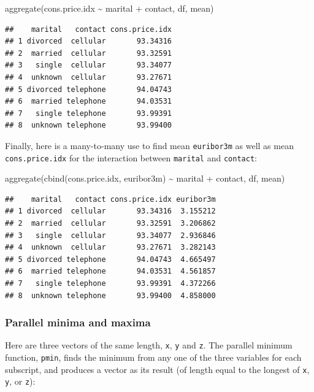 \documentclass[
]{book}
\newenvironment{Shaded}{\begin{snugshade}}{\end{snugshade}}
\newcommand{\FunctionTok}[1]{\textcolor[rgb]{0.00,0.00,0.00}{#1}}
\newcommand{\NormalTok}[1]{#1}
\newcommand{\SpecialCharTok}[1]{\textcolor[rgb]{0.00,0.00,0.00}{#1}}
\begin{document}
\begin{Shaded}
\begin{Highlighting}[]
\FunctionTok{aggregate}\NormalTok{(cons.price.idx }\SpecialCharTok{\textasciitilde{}}\NormalTok{ marital }\SpecialCharTok{+}\NormalTok{ contact, df, mean)}
\end{Highlighting}
\end{Shaded}

\begin{verbatim}
##    marital   contact cons.price.idx
## 1 divorced  cellular       93.34316
## 2  married  cellular       93.32591
## 3   single  cellular       93.34077
## 4  unknown  cellular       93.27671
## 5 divorced telephone       94.04743
## 6  married telephone       94.03531
## 7   single telephone       93.99391
## 8  unknown telephone       93.99400
\end{verbatim}

Finally, here is a many-to-many use to find mean \texttt{euribor3m} as well as mean \texttt{cons.price.idx} for the interaction between \texttt{marital} and \texttt{contact}:

\begin{Shaded}
\begin{Highlighting}[]
\FunctionTok{aggregate}\NormalTok{(}\FunctionTok{cbind}\NormalTok{(cons.price.idx, euribor3m) }\SpecialCharTok{\textasciitilde{}}\NormalTok{ marital }\SpecialCharTok{+}\NormalTok{ contact, df, mean)}
\end{Highlighting}
\end{Shaded}

\begin{verbatim}
##    marital   contact cons.price.idx euribor3m
## 1 divorced  cellular       93.34316  3.155212
## 2  married  cellular       93.32591  3.206862
## 3   single  cellular       93.34077  2.936846
## 4  unknown  cellular       93.27671  3.282143
## 5 divorced telephone       94.04743  4.665497
## 6  married telephone       94.03531  4.561857
## 7   single telephone       93.99391  4.372266
## 8  unknown telephone       93.99400  4.858000
\end{verbatim}

\hypertarget{parallel-minima-and-maxima}{%
\subsubsection{Parallel minima and maxima}\label{parallel-minima-and-maxima}}

Here are three vectors of the same length, \texttt{x}, \texttt{y} and \texttt{z}. The parallel minimum function, \texttt{pmin}, finds the minimum from any one of the three variables for each subscript, and produces a vector as its result (of length equal to the longest of \texttt{x}, \texttt{y}, or \texttt{z}):
\end{document}
